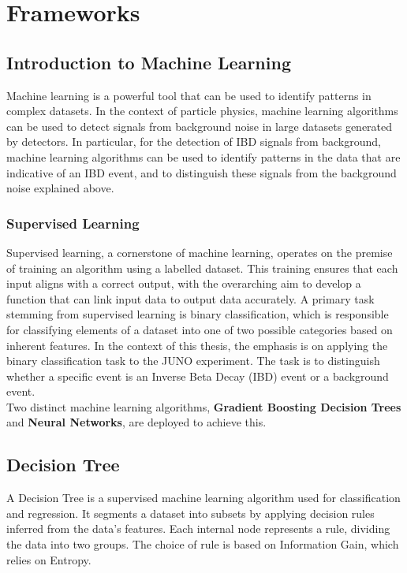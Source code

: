 \chapter{Frameworks}
\section{Introduction to Machine Learning}

Machine learning is a powerful tool that can be used to identify patterns in complex datasets. In the context of particle physics, machine learning algorithms can be used to detect signals from background noise in large datasets generated by detectors. In particular, for the detection of IBD signals from background, machine learning algorithms can be used to identify patterns in the data that are indicative of an IBD event, and to distinguish these signals from the background noise explained above.

\subsection{Supervised Learning}
Supervised learning, a cornerstone of machine learning, operates on the premise of training an algorithm using a labelled dataset. This training ensures that each input aligns with a correct output, with the overarching aim to develop a function that can link input data to output data accurately. A primary task stemming from supervised learning is binary classification, which is responsible for classifying elements of a dataset into one of two possible categories based on inherent features. In the context of this thesis, the emphasis is on applying the binary classification task to the JUNO experiment. The task is to distinguish whether a specific event is an Inverse Beta Decay (IBD) event or a background event.\\
 
Two distinct machine learning algorithms, \textbf{Gradient Boosting Decision Trees} and \textbf{Neural Networks}, are deployed to achieve this.

\section{Decision Tree}
A Decision Tree is a supervised machine learning algorithm used for classification and regression. It segments a dataset into subsets by applying decision rules inferred from the data's features. Each internal node represents a rule, dividing the data into two groups. The choice of rule is based on Information Gain, which relies on Entropy.


